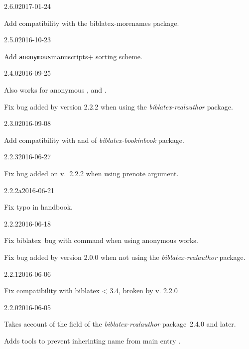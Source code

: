\documentclass{ltxdockit}[2011/03/25]
\newcommand{\biblatex}{biblatex\xspace}
\begin{document}
\begin{changelog}

\begin{release}{2.6.0}{2017-01-24}
	\item Add compatibility with the biblatex-morenames package.
\end{release}

\begin{release}{2.5.0}{2016-10-23}
  \item Add \verb+anonymous+manuscripts+ sorting scheme.
\end{release}

\begin{release}{2.4.0}{2016-09-25}
  \item Also works for anonymous ,  and .
  \item Fix bug added by version 2.2.2 when using the \emph{biblatex-realauthor} package.
\end{release}

\begin{release}{2.3.0}{2016-09-08}
  \item Add compatibility with  and  of \emph{biblatex-bookinbook} package.
\end{release}

\begin{release}{2.2.3}{2016-06-27}
  \item Fix bug added on v.~2.2.2 when using prenote argument.
 \end{release}

\begin{release}{2.2.2a}{2016-06-21}
  \item Fix typo in handbook.
 \end{release}

\begin{release}{2.2.2}{2016-06-18}
  \item Fix \biblatex\ bug with  \expandafter\cs\expandafter{\prm{xx}cites} command when using anonymous works.
  \item Fix bug added by version 2.0.0 when not using the \emph{biblatex-realauthor} package.
 \end{release}
\begin{release}{2.2.1}{2016-06-06}
 \item Fix compatibility with biblatex < 3.4, broken by v. 2.2.0
\end{release}
\begin{release}{2.2.0}{2016-06-05}
  \item Takes account of the  field of the \emph{biblatex-realauthor} package~2.4.0 and later.
  \item Adds tools to prevent inherinting name from main entry .
\end{release}


\end{changelog}
\end{document}
